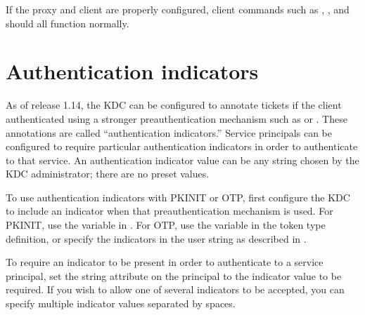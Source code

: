 \documentclass[letterpaper,10pt,english]{sphinxmanual}
\begin{document}
\begin{sphinxVerbatim}[commandchars=\\\{\}]
  
  
\end{sphinxVerbatim}

\sphinxAtStartPar
If the proxy and client are properly configured, client commands such
as , , and  should all function normally.

\sphinxstepscope


\chapter{Authentication indicators}
\label{\detokenize{admin/auth_indicator:authentication-indicators}}\label{\detokenize{admin/auth_indicator:auth-indicator}}\label{\detokenize{admin/auth_indicator::doc}}
\sphinxAtStartPar
As of release 1.14, the KDC can be configured to annotate tickets if
the client authenticated using a stronger preauthentication mechanism
such as {\hyperref[\detokenize{admin/pkinit:pkinit}]{}} or {\hyperref[\detokenize{admin/otp:otp-preauth}]{}}.  These
annotations are called “authentication indicators.”  Service
principals can be configured to require particular authentication
indicators in order to authenticate to that service.  An
authentication indicator value can be any string chosen by the KDC
administrator; there are no pre\sphinxhyphen{}set values.

\sphinxAtStartPar
To use authentication indicators with PKINIT or OTP, first configure
the KDC to include an indicator when that preauthentication mechanism
is used.  For PKINIT, use the  variable in
{\hyperref[\detokenize{admin/conf_files/kdc_conf:kdc-conf-5}]{}}.  For OTP, use the  variable in the
token type definition, or specify the indicators in the  user
string as described in {\hyperref[\detokenize{admin/otp:otp-preauth}]{}}.

\sphinxAtStartPar
To require an indicator to be present in order to authenticate to a
service principal, set the  string attribute on the
principal to the indicator value to be required.  If you wish to allow
one of several indicators to be accepted, you can specify multiple
indicator values separated by spaces.
\end{document}

